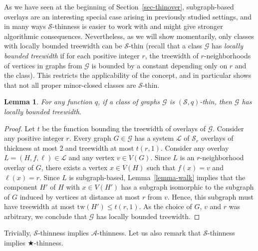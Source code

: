 \documentclass[a4paper,11pt]{article}
\newcommand{\Aa}{{\mathcal A}}
\newcommand{\GG}{{\mathcal G}}
\newcommand{\LL}{{\mathcal L}}
\newcommand{\Ss}{{\mathcal S}}
\newcommand{\tw}{\text{tw}}
\newtheorem{lemma}[theorem]{Lemma}
\begin{document}
As we have seen at the beginning of Section~\ref{sec-thinover},
subgraph-based overlays are an interesting special case arising
in previously studied settings, and in many ways $\Ss$-thinness is easier to work with and might give stronger algorithmic consequences.
Nevertheless, as we will show momentarily, only classes with locally bounded treewidth can be $\Ss$-thin
(recall that a class $\GG$ has \emph{locally bounded treewidth} if for each positive integer $r$,
the treewidth of $r$-neighborhoods of vertices in graphs from $\GG$ is bounded by a constant depending only on $r$
and the class).  This restricts the applicability of the concept, and in particular shows that not all proper
minor-closed classes are $\Ss$-thin.

\begin{lemma}\label{lemma-localtw}
For any function $q$, if a class of graphs $\GG$ is $(\Ss,q)$-thin, then $\GG$ has locally bounded treewidth.
\end{lemma}
\begin{proof}
Let $t$ be the function bounding the treewidth of overlays of $\GG$.
Consider any positive integer $r$.
Every graph $G\in\GG$ has a system $\LL$ of $\Ss_r$ overlays of thickness at most $2$
and treewidth at most $t(r,1)$.  Consider any overlay $L=(H,f,\ell)\in\LL$ and any vertex $v\in V(G)$.  Since $L$ is an $r$-neighborhood overlay of $G$,
there exists a vertex $x\in V(H)$ such that $f(x)=v$ and $\ell(x)=r$.  Since $L$ is subgraph-based,
Lemma~\ref{lemma-walk} implies that the component $H'$ of $H$ with $x\in V(H')$ has a subgraph isomorphic to the subgraph of $G$ induced by vertices
at distance at most $r$ from $v$.  Hence, this subgraph must have treewidth at most $\tw(H')\le t(r,1)$.
As the choice of $G$, $v$ and $r$ was arbitrary, we conclude that $\GG$ has locally bounded treewidth.
\end{proof}

Trivially, $\Ss$-thinness implies $\Aa$-thinness. Let us also remark that $\Ss$-thinness implies $\bigstar$-thinness.
\end{document}
